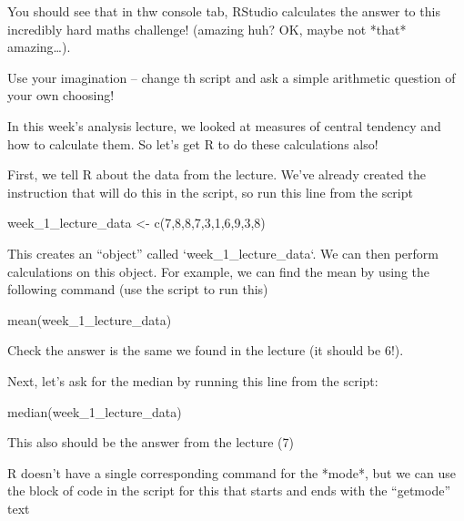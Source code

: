 \documentclass[
]{book}
\newenvironment{Shaded}{\begin{snugshade}}{\end{snugshade}}
\newcommand{\DecValTok}[1]{\textcolor[rgb]{0.00,0.00,0.81}{#1}}
\newcommand{\FunctionTok}[1]{\textcolor[rgb]{0.00,0.00,0.00}{#1}}
\newcommand{\NormalTok}[1]{#1}
\newcommand{\OtherTok}[1]{\textcolor[rgb]{0.56,0.35,0.01}{#1}}
\begin{document}
You should see that in thw console tab, RStudio calculates the answer to this incredibly hard maths challenge! (amazing huh? OK, maybe not
*that* amazing\ldots).

Use your imagination -- change th script and ask a simple arithmetic question of your own choosing!

In this week's analysis lecture, we looked at measures of central tendency and how to calculate them. So let's get R to do these calculations also!

First, we tell R about the data from the lecture. We've already created the instruction that will do this in the script, so run this line from the script

\begin{Shaded}
\begin{Highlighting}[]
\NormalTok{week\_1\_lecture\_data }\OtherTok{\textless{}{-}} \FunctionTok{c}\NormalTok{(}\DecValTok{7}\NormalTok{,}\DecValTok{8}\NormalTok{,}\DecValTok{8}\NormalTok{,}\DecValTok{7}\NormalTok{,}\DecValTok{3}\NormalTok{,}\DecValTok{1}\NormalTok{,}\DecValTok{6}\NormalTok{,}\DecValTok{9}\NormalTok{,}\DecValTok{3}\NormalTok{,}\DecValTok{8}\NormalTok{)}
\end{Highlighting}
\end{Shaded}

This creates an ``object'' called `week\_1\_lecture\_data`. We can then perform calculations on this object. For example, we can find the mean by using the following command (use the script to run this)

\begin{Shaded}
\begin{Highlighting}[]
\FunctionTok{mean}\NormalTok{(week\_1\_lecture\_data)}
\end{Highlighting}
\end{Shaded}

Check the answer is the same we found in the lecture (it should be 6!).

Next, let's ask for the median by running this line from the script:

\begin{Shaded}
\begin{Highlighting}[]
\FunctionTok{median}\NormalTok{(week\_1\_lecture\_data)}
\end{Highlighting}
\end{Shaded}

This also should be the answer from the lecture (7)

R doesn't have a single corresponding command for the *mode*, but we can use the block of code in the script for this that starts and ends with the ``getmode'' text
\end{document}
